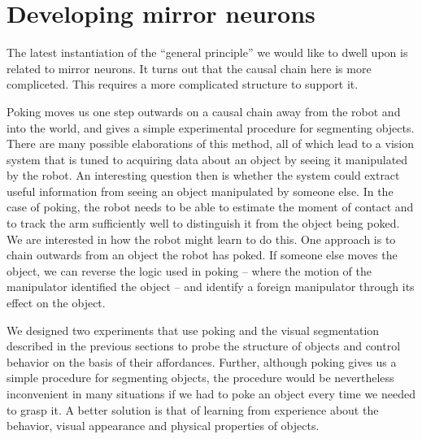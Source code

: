 
\section{Developing mirror neurons}

\ifverbose
The latest instantiation of the ``general principle'' we would like to
dwell upon is related to mirror neurons. It turns out that the causal
chain here is more compliceted. This requires a more complicated
structure to support it.
\fi

Poking moves us one step outwards on a causal chain away from the
robot and into the world, and gives a simple experimental procedure
for segmenting objects.  There are many possible elaborations of this
method, all of which lead to a
vision system that is tuned to acquiring data about an object by
seeing it manipulated by the robot.  An interesting question then is
whether the system could extract useful information from seeing an
object manipulated by someone else.  In the case of poking, the robot
needs to be able to estimate the moment of contact and to track the arm
sufficiently well to distinguish it from the object being poked.  We
are interested in how the robot might learn to do this.  One approach
is to chain outwards from an object the robot has poked.  If someone
else moves the object, we can reverse the logic used in poking --
where the motion of the manipulator identified the object -- and
identify a foreign manipulator through its effect on the object.

We designed two experiments that use poking and the visual
segmentation described in the previous sections to probe 
the structure of objects and control behavior on the basis of
their affordances. Further, although poking gives us a simple 
procedure for segmenting objects, the procedure would be 
nevertheless inconvenient in many situations if we had to poke an 
object every time we needed to grasp it. A better solution is that 
of learning from experience about the behavior, visual appearance and 
physical properties of objects.


